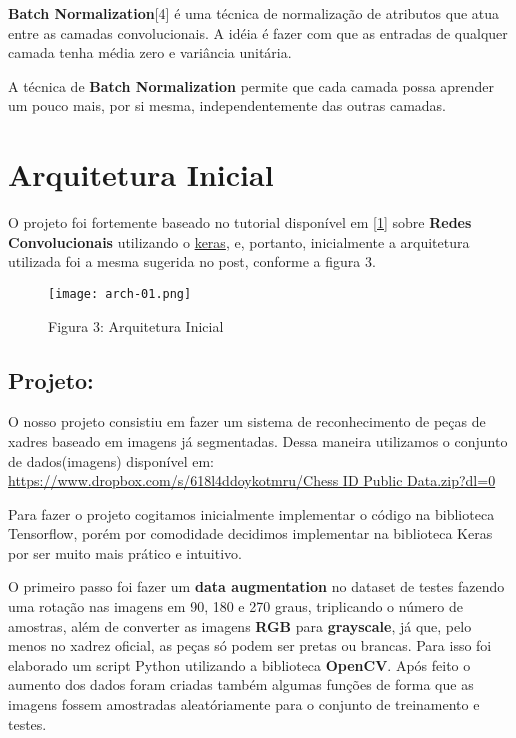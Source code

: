 \textbf{Batch Normalization}[4] é uma técnica de normalização de atributos que atua
entre as camadas convolucionais. A idéia é fazer com que as entradas de qualquer
camada tenha média zero e variância unitária.

A técnica de \textbf{Batch Normalization} permite que cada camada possa aprender
um pouco mais, por si mesma, independentemente das outras camadas.

    \section{Arquitetura Inicial}\label{arquitetura-inicial}

O projeto foi fortemente baseado no tutorial disponível em
\href{http://adventuresinmachinelearning.com/keras-tutorial-cnn-11-lines/}{[1]} sobre \textbf{Redes
Convolucionais} utilizando o \href{https://keras.io/}{keras}, e, portanto, inicialmente a
arquitetura utilizada foi a mesma sugerida no post, conforme a figura 3.

\begin{figure}[ht]
\centering
\texttt{[image: arch-01.png]}
\caption{Figura 3: Arquitetura Inicial}
\end{figure}


    \subsection{Projeto:}\label{projeto}

O nosso projeto consistiu em fazer um sistema de reconhecimento de peças
de xadres baseado em imagens já segmentadas. Dessa maneira utilizamos o
conjunto de dados(imagens) disponível em:
\href{https://www.dropbox.com/s/618l4ddoykotmru/Chess\%20ID\%20Public\%20Data.zip?dl=0}{
https://www.dropbox.com/s/618l4ddoykotmru/Chess ID Public Data.zip?dl=0}

Para fazer o projeto cogitamos inicialmente implementar o código na
biblioteca Tensorflow, porém por comodidade decidimos implementar na
biblioteca Keras por ser muito mais prático e intuitivo.

O primeiro passo foi fazer um \textbf{data augmentation} no dataset de
testes fazendo uma rotação nas imagens em 90, 180 e 270 graus,
triplicando o número de amostras, além de converter as imagens
\textbf{RGB} para \textbf{grayscale}, já que, pelo menos no xadrez
oficial, as peças só podem ser pretas ou brancas. Para isso foi
elaborado um script Python utilizando a biblioteca \textbf{OpenCV}. Após
feito o aumento dos dados foram criadas também algumas funções de forma
que as imagens fossem amostradas aleatóriamente para o conjunto de
treinamento e testes.

